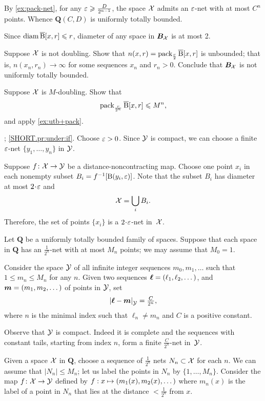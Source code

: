 By \ref{ex:pack-net}, for any $\varepsilon\geqslant\frac D{2^{n-1}}$, the space $\mathcal{X}$ admits an $\varepsilon$-net with at most $C^n$ points.
Whence $\bm{Q}(C,D)$ is uniformly totally bounded.

Since $\operatorname{\rm diam}\nolimits \overline{\mathrm{B}}{}[x,r]\leqslant r$, diameter of any space in $\bm{B}_{\mathcal{X}}$ is at most 2.

Suppose $\mathcal{X}$ is not doubling.
Show that $n(x,r)=\operatorname{\rm pack}\nolimits_{\frac r2}\overline{\mathrm{B}}{}[x,r]$ is unbounded;
that is, $n(x_n,r_n)\to\infty$ for some sequences $x_n$ and $r_n>0$.
Conclude that $\bm{B}_{\mathcal{X}}$ is not uniformly totally bounded.

Suppose $\mathcal{X}$ is $M$-doubling.
Show that 
\[\operatorname{\rm pack}\nolimits_{\frac r{2^n}}\overline{\mathrm{B}}{}[x,r]\leqslant M^n,\]
and apply \ref{ex:utb+pack}.



\parbf{\ref{pr:under}}; \ref{SHORT.pr:under:if}.
Choose $\varepsilon>0$.
Since $\mathcal{Y}$ is compact, we can choose a finite $\varepsilon$-net $\{y_1,\dots,y_{n}\}$ in $\mathcal{Y}$.

Suppose $f\colon\mathcal{X}\to \mathcal{Y}$ be a distance-noncontracting map.
Choose one point $x_i$ in each nonempty subset $B_i=f^{-1}[\mathrm{B}{}(y_i,\varepsilon)]$.
Note that the subset $B_i$ has diameter at most $2\cdot \eps$ and 
\[\mathcal{X}=\bigcup_iB_i.\]
Therefore, the set of points $\{x_i\}$ is a $2\cdot\eps$-net in~$\mathcal{X}$.

Let $\bm{Q}$ be a uniformly totally bounded family of spaces. 
Suppose that each space in $\bm{Q}$ has an $\tfrac1{2^n}$-net with at most $M_n$ points; we may assume that $M_0=1$.

Consider the space $\mathcal{Y}$ of all infinite integer sequences $m_0,m_1,\dots$ such that $1\le m_n\le M_n$ for any $n$.
Given two sequences $\bm{\ell}\z=(\ell_1,\ell_2,\dots)$, and $\bm{m}\z=(m_1,m_2,\dots)$ of points in $\mathcal{Y}$, set 
\[\dist{\bm{\ell}}{\bm{m}}{\spc{Y}}=\tfrac C{2^{n}},\]
where $n$ is the minimal index such that $\ell_n\ne m_n$ and $C$ is a positive constant.

Observe that $\mathcal{Y}$ is compact.
Indeed it is complete and the sequences with constant tails, starting from index $n$, form a finite $\tfrac C{2^{n}}$-net in~$\mathcal{Y}$.

Given a space $\mathcal{X}$ in $\bm{Q}$,
choose a sequence of $\tfrac1{2^n}$ nets 
$N_n\subset\mathcal{X}$ for each $n$.
We can assume that $|N_n|\le M_n$; let us label the points in $N_n$ by $\{1,\dots,M_n\}$.
Consider the map $f\colon\mathcal{X}\to\mathcal{Y}$ defined by $f:x\z\mapsto (m_1(x),m_2(x),\dots)$ where $m_n(x)$ is the label of a point in $N_n$ that lies at the distance $<\tfrac1{2^n}$ from $x$.

